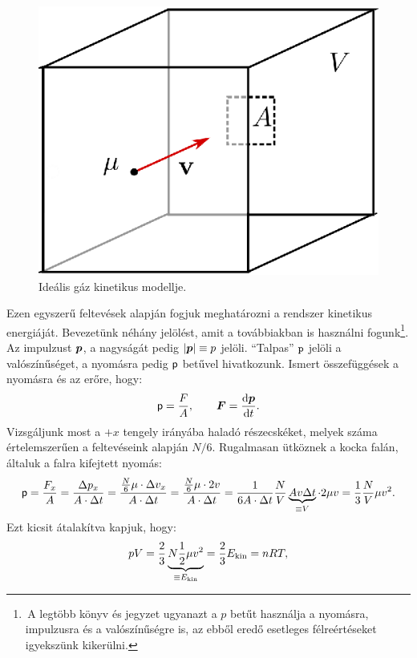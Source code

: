 \begin{figure}
    \centering
    \includegraphics{termo_3/termo_3_1.eps}
    \caption{Ideális gáz kinetikus modellje.}
    \label{fig:termo_3_1}
\end{figure}
Ezen egyszerű feltevések alapján fogjuk meghatározni a rendszer kinetikus energiáját. Bevezetünk néhány jelölést, amit a továbbiakban is használni fogunk\footnote{\,A legtöbb könyv és jegyzet ugyanazt a $p$ betűt használja a nyomásra, impulzusra és a valószínűségre is, az ebből eredő esetleges félreértéseket igyekszünk kikerülni.}. Az impulzust $\bm p$, a nagyságát pedig $|\bm p|\equiv p$ jelöli. ``Talpas'' $\mathtt p$ jelöli a valószínűséget, a nyomásra pedig $\mathsf p$ betűvel hivatkozunk. Ismert összefüggések a nyomásra és az erőre, hogy:
\begin{align}
    \mathsf p = \frac FA,\qquad \bm F = \frac{\mathrm{d}{\bm p}}{\mathrm{d}{t}}.
\end{align}
Vizsgáljunk most a ${+}x$ tengely irányába haladó részecskéket, melyek száma értelemszerűen a feltevéseink alapján $N/6$. Rugalmasan ütköznek a kocka falán, általuk a falra kifejtett nyomás:
\begin{align}
    \mathsf p = \frac{F_x}{A} = \frac{\Delta p_x}{A\cdot \Delta t} = \frac{\frac N6 \mu \cdot \Delta v_x}{A\cdot \Delta t} = \frac{\frac N6 \mu\cdot 2v}{A\cdot \Delta t} = \frac{1}{6A\cdot\Delta t}\frac NV \underbrace{Av\Delta t}_{\equiv V}\cdot 2\mu v = \frac 13 \frac NV \mu v^2.
\end{align}
Ezt kicsit átalakítva kapjuk, hogy:
\begin{align}
    pV = \frac 23 \underbrace{N\frac 12\mu v^2}_{\equiv E_{\textnormal{kin}}} = \frac 23 E_{\textnormal{kin}} = nRT,
\end{align}
